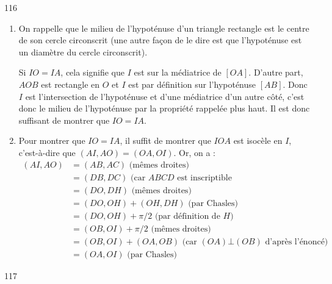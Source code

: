 \begin{Soln}{116}
\begin{enumerate}
\item On rappelle que le milieu de l'hypoténuse d'un triangle rectangle est le centre de son cercle circonscrit (une autre façon de le dire est que l'hypoténuse est un diamètre du cercle circonscrit).

Si $IO=IA$, cela signifie que $I$ est sur la médiatrice de $[OA]$. D'autre part, $AOB$ est rectangle en $O$ et $I$ est par définition sur l'hypoténuse $[AB]$. Donc $I$ est  l'intersection de l'hypoténuse et d'une médiatrice d'un autre côté, c'est donc le milieu de l'hypoténuse par la propriété rappelée plus haut. Il est donc suffisant de montrer que $IO=IA$.


\item Pour montrer que $IO=IA$, il suffit de montrer que $IOA$ est isocèle en $I$, c'est-à-dire que $(AI,AO)=(OA,OI)$. Or, on a :
\begin{align*}
(AI,AO)& = (AB,AC) \text{ (mêmes droites)}\\
&= (DB,DC) \text{ (car $ABCD$ est inscriptible}\\
&= (DO,DH) \text{ (mêmes droites)}\\
&= (DO,OH)+(OH,DH) \text{ (par Chasles)}\\
&= (DO,OH)+\pi/2 \text{ (par définition de $H$)}\\
&= (OB,OI)+\pi/2 \text{ (mêmes droites)}\\
&= (OB,OI) + (OA,OB) \text{ (car $(OA)\bot (OB)$ d'après l'énoncé)}\\
&= (OA,OI) \text{ (par Chasles)}
\end{align*}
\end{enumerate}

\end{Soln}
\begin{Soln}{117}
\begin{center}
\end{center}
\end{Soln}
